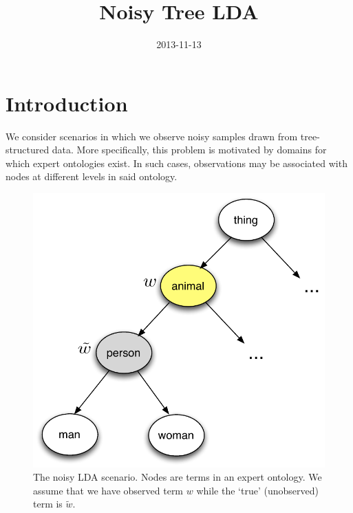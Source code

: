 \documentclass[]{article}
\title{Noisy Tree LDA}
\date{2013-11-13}
\begin{document}
\ifpdf
{}
\else
{}
\fi

\maketitle




\section{Introduction}

We consider scenarios in which we observe noisy samples drawn from tree-structured data. More specifically, this problem is motivated by domains for which expert ontologies exist. In such cases, observations may be associated with nodes at different levels in said ontology.

\begin{figure}[h!]
  \centering
    \includegraphics[scale=.5]{../figures/ontology-observed.pdf}
  \caption{The noisy LDA scenario. Nodes are terms in an expert ontology. We assume that we have observed term $w$ while the `true' (unobserved) term is $\tilde{w}$.}
\end{figure}
\end{document}
